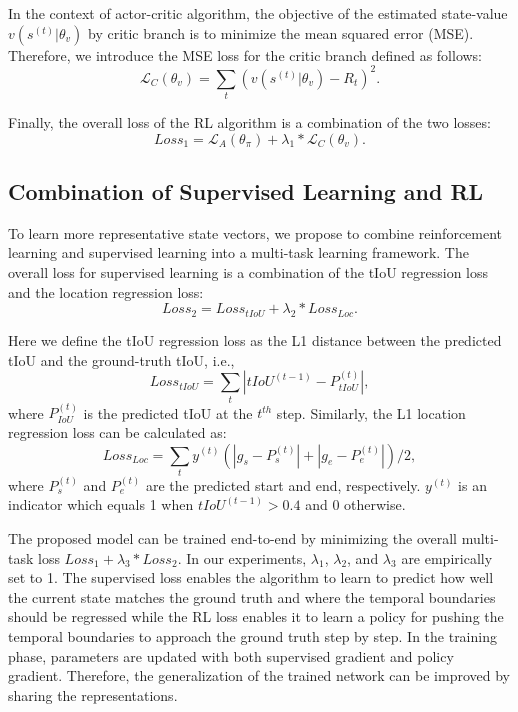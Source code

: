 \documentclass[letterpaper]{article} %
\begin{document}
In the context of actor-critic algorithm, the objective of the estimated state-value $v(s^{(t)}|\theta_v)$ by critic branch is to minimize the mean squared error (MSE). Therefore, we introduce the MSE loss for the critic branch defined as follows:
\begin{equation}
\label{eq:loss_mse}
\mathcal{L}_{C}(\theta_v) = \sum_{t}{\left(v(s^{(t)}|\theta_v)-R_t\right)^2}.
\end{equation}

Finally, the overall loss of the RL algorithm is a combination of the two losses:
\begin{equation}
Loss_1 = \mathcal{L}_{A}(\theta_\pi) + {\lambda}_1 * \mathcal{L}_{C}(\theta_v).
\end{equation}

\subsection{Combination of Supervised Learning and RL}
To learn more representative state vectors, we propose to combine reinforcement learning and supervised learning into a multi-task learning framework. The overall loss for supervised learning is a combination of the tIoU regression loss and the location regression loss:
\begin{equation}
Loss_2 = Loss_{tIoU} + {\lambda}_2 * Loss_{Loc}.
\end{equation}

Here we define the tIoU regression loss as the L1 distance between the predicted tIoU and the ground-truth tIoU, i.e.,
\begin{equation}
Loss_{tIoU} = \sum_{t}|tIoU^{(t-1)} - P_{tIoU}^{(t)}|,
\end{equation}
where $P_{IoU}^{(t)}$ is the predicted tIoU at the $t^{th}$ step. Similarly, the L1 location regression loss can be calculated as:
\begin{equation}
\label{eq:loc_loss}
Loss_{Loc} = \sum_{t}y^{(t)}\left(|g_s - P_{s}^{(t)}|+|g_e-P_e^{(t)}|\right)/2,
\end{equation}
where $P_s^{(t)}$ and $P_e^{(t)}$ are the predicted start and end, respectively. $y^{(t)}$ is an indicator which equals 1 when $tIoU^{(t-1)} > 0.4$ and 0 otherwise.

The proposed model can be trained end-to-end by minimizing the overall multi-task loss $Loss_1 + \lambda_3 * Loss_2$. In our experiments, $\lambda_1$, $\lambda_2$, and $\lambda_3$ are empirically set to 1. The supervised loss enables the algorithm to learn to predict how well the current state matches the ground truth and where the temporal boundaries should be regressed while the RL loss enables it to learn a policy for pushing the temporal boundaries to approach the ground truth step by step. In the training phase, parameters are updated with both supervised gradient and policy gradient. Therefore, the generalization of the trained network can be improved by sharing the representations.
\end{document}

